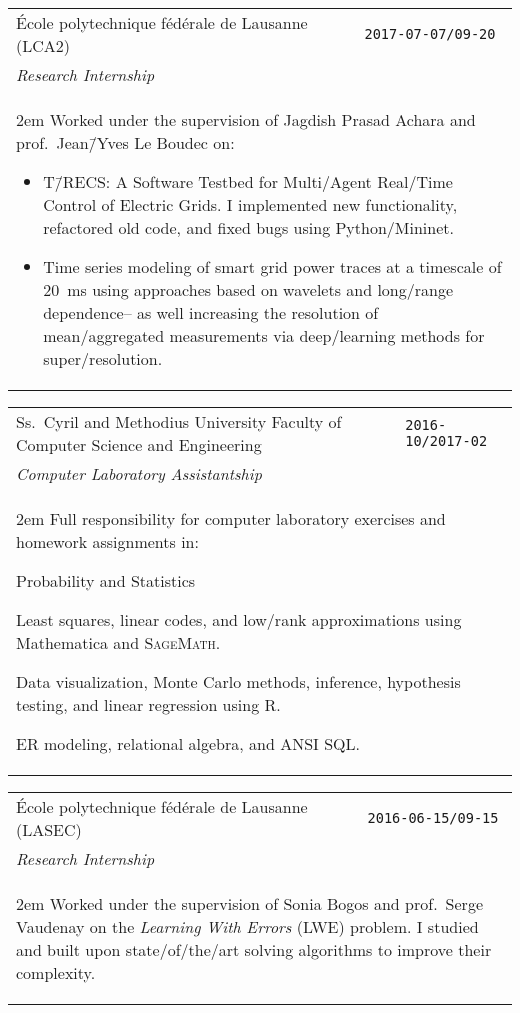 \documentclass[version=last, paper=A4, DIV=12, toc=bibliography]{scrartcl}%
\newcommand*{\WorkEntry}[4]{%
  \noindent%
  \begin{tabular}{p{.7\textwidth-2\tabcolsep}>{\raggedleft\arraybackslash}p{.3\textwidth-2\tabcolsep}}
    \textsf{#2} & \Verb+#1+\\
    \textit{#3} &\\
    \multicolumn{2}{p{\textwidth-2\tabcolsep}}{\begin{addmargin}{2em}\small#4\end{addmargin}}
  \end{tabular}%
}
\begin{document}
\WorkEntry{2017-07-07/09-20}{%
  École polytechnique fédérale de Lausanne (LCA2)%
}{%
  Research Internship%
}{%
  Worked under the supervision of Jagdish Prasad Achara and prof.\ Jean\=/Yves
  Le Boudec on:
  \begin{itemize}[noitemsep, leftmargin=*]
  \item T\=/RECS\@: A Software Testbed for Multi\-/Agent Real\-/Time Control of
    Electric Grids.  I implemented new functionality, refactored old code, and
    fixed bugs using Python/Mininet.
  \item Time series modeling of smart grid power traces at a timescale of
    \SI{20}{\ms} using approaches based on wavelets and long\-/range
    dependence\--- as well increasing the resolution of mean\-/aggregated
    measurements via deep\-/learning methods for super\-/resolution.
  \end{itemize}%
}

\WorkEntry{2016-10/2017-02}{%
  Ss.\ Cyril and Methodius University\newline%
  Faculty of Computer Science and Engineering%
}{%
  Computer Laboratory Assistantship%
}{%
  Full responsibility for computer laboratory exercises and homework assignments
  in:
  \begin{labeling}{Probability and Statistics}
  \item[Linear Algebra] Least squares, linear codes, and low\-/rank
    approximations using Mathematica\textsuperscript{\textregistered} and
    \textsc{SageMath}.
  \item[Probability and Statistics] Data visualization, Monte Carlo methods,
    inference, hypothesis testing, and linear regression using R.
  \item[Databases] ER modeling, relational algebra, and ANSI SQL\@.
  \end{labeling}%
}

\WorkEntry{2016-06-15/09-15}{%
  École polytechnique fédérale de Lausanne (LASEC)%
}{Research Internship}{%
  Worked under the supervision of Sonia Bogos and prof.\ Serge Vaudenay on the
  \emph{Learning With Errors} (LWE) problem.  I studied and built upon
  state\-/of\-/the\-/art solving algorithms to improve their complexity.%
}

\end{document}
